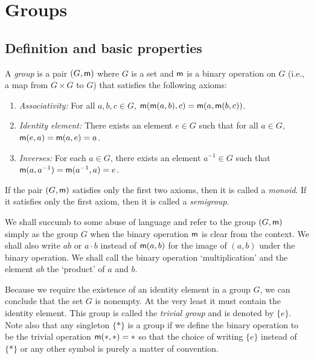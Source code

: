 \chapter{Groups}
\label{ch:groups}

\section{Definition and basic properties}

\begin{definition}
    A \emph{group} is a pair \((G, {\mathsf{m}})\) where \(G\) is a  set and \({\mathsf{m}}\)
    is a binary operation on \(G\) (i.e., a map from \(G \times G\) to \(G\))
    that satisfies the following axioms:
    \begin{enumerate}
        \item \emph{Associativity:} For all \(a, b, c \in G\), \({\mathsf{m}}({\mathsf{m}}(a,
        b), c) = {\mathsf{m}}(a, {\mathsf{m}}(b, c))\).
        \item \emph{Identity element:} There exists an element \(e \in G\) such
        that for all \(a \in G\), \({\mathsf{m}}(e, a) = {\mathsf{m}}(a, e) = a\).
        \item \emph{Inverses:} For each \(a \in G\), there exists an element
        \(a^{-1} \in G\) such that \({\mathsf{m}}(a, a^{-1}) = {\mathsf{m}}(a^{-1}, a) = e\).
    \end{enumerate}
\end{definition}

\begin{remark}
    If the pair \((G, {\mathsf{m}})\) satisfies only the first two axioms, then it is
    called a \emph{monoid}. If it satisfies only the first axiom, then it is
    called a \emph{semigroup}.
\end{remark}

\begin{remark}
    We shall succumb to some abuse of language and refer to the group \((G,
    {\mathsf{m}})\) simply as the group \(G\) when the binary operation \({\mathsf{m}}\) is
    clear from the context. We shall also write \(ab\) or \(a \cdot b\) instead
    of \({\mathsf{m}}(a, b)\) for the image of \((a, b)\) under the binary operation.
    We shall call the binary operation `multiplication' and the element \(ab\)
    the `product' of \(a\) and \(b\).
\end{remark}

\begin{remark}
    Because we require the existence of an identity element in a group \(G\), we
    can conclude that the set \(G\) is nonempty. At the very least it must
    contain the identity element. This group is called the \emph{trivial group}
    and is denoted by \(\{e\}\). Note also that any singleton \(\{*\}\) is a
    group if we define the binary operation to be the trivial operation
    \({\mathsf{m}}(*, *) = *\) so that the choice of writing \(\{e\}\) instead of
    \(\{*\}\) or any other symbol is purely a matter of convention.
\end{remark}

